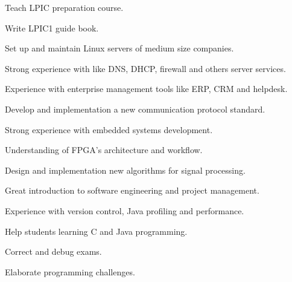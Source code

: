 \documentclass[]{deedy-resume-openfont}
\begin{document}
\begin{minipage}[t]{0.66\textwidth}
\begin{tightemize}
\item Teach LPIC preparation course.
\item Write LPIC1 guide book.
\end{tightemize}
\sectionsep

\begin{tightemize}
\item Set up and maintain Linux servers of medium size companies.
\item Strong experience with like DNS, DHCP, firewall and others server services.
\item Experience with enterprise management tools like ERP, CRM and helpdesk.
\end{tightemize}
\sectionsep

\begin{tightemize}
\item Develop and implementation a new communication protocol standard.
\item Strong experience with embedded systems development.
\item Understanding of FPGA's architecture and workflow.
\end{tightemize}
\sectionsep

\begin{tightemize}
\item Design and implementation new algorithms for signal processing.
\item Great introduction to software engineering and project management.
\item Experience with version control, Java profiling and performance.
\end{tightemize}
\sectionsep

\begin{tightemize}
\item Help students learning C and Java programming.
\item Correct and debug exams.
\item Elaborate programming challenges.
\end{tightemize}
\sectionsep
\end{minipage} 
\end{document}
